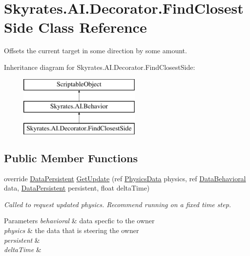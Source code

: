 \hypertarget{class_skyrates_1_1_a_i_1_1_decorator_1_1_find_closest_side}{\section{Skyrates.\-A\-I.\-Decorator.\-Find\-Closest\-Side Class Reference}
\label{class_skyrates_1_1_a_i_1_1_decorator_1_1_find_closest_side}
}


Offsets the current target in some direction by some amount.  


Inheritance diagram for Skyrates.\-A\-I.\-Decorator.\-Find\-Closest\-Side\-:\begin{figure}[H]
\begin{center}
\leavevmode
\includegraphics[height=3.000000cm]{class_skyrates_1_1_a_i_1_1_decorator_1_1_find_closest_side}
\end{center}
\end{figure}
\subsection*{Public Member Functions}
\begin{DoxyCompactItemize}
\item 
\hypertarget{class_skyrates_1_1_a_i_1_1_decorator_1_1_find_closest_side_ab3cb3961315f22860984629e20565f53}{override \hyperlink{class_skyrates_1_1_a_i_1_1_behavior_1_1_data_persistent}{Data\-Persistent} \hyperlink{class_skyrates_1_1_a_i_1_1_decorator_1_1_find_closest_side_ab3cb3961315f22860984629e20565f53}{Get\-Update} (ref \hyperlink{class_skyrates_1_1_physics_1_1_physics_data}{Physics\-Data} physics, ref \hyperlink{class_skyrates_1_1_a_i_1_1_behavior_1_1_data_behavioral}{Data\-Behavioral} data, \hyperlink{class_skyrates_1_1_a_i_1_1_behavior_1_1_data_persistent}{Data\-Persistent} persistent, float delta\-Time)}\label{class_skyrates_1_1_a_i_1_1_decorator_1_1_find_closest_side_ab3cb3961315f22860984629e20565f53}

\begin{DoxyCompactList}\small\item\em Called to request updated physics. Recommend running on a fixed time step. 


\begin{DoxyParams}{Parameters}
{\em behavioral} & data specfic to the owner\\
\hline
{\em physics} & the data that is steering the owner\\
\hline
{\em persistent} & \\
\hline
{\em delta\-Time} & \\
\hline
\end{DoxyParams}
 \end{DoxyCompactList}\end{DoxyCompactItemize}

